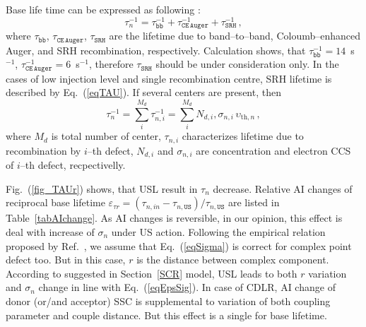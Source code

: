\documentclass[aip,jap, amsmath,amssymb,reprint]{revtex4-1}
\begin{document}
Base life time can be expressed as following \cite{MurphyJAP2011}:
\begin{equation}
\label{eqTAUsum}
\tau_n^{-1}=\tau_\mathtt{bb}^{-1}+\tau_\mathtt{CE\,Auger}^{-1}+\tau_\mathtt{SRH}^{-1}\,,
\end{equation}
where
$\tau_\mathtt{bb}$, $\tau_\mathtt{CE\,Auger}$, $\tau_\mathtt{SRH}$ are the lifetime due to band--to--band, Coloumb--enhanced Auger, and
SRH recombination, respectively.
Calculation shows, that $\tau_\mathtt{bb}^{-1}=14$~s$^{-1}$, $\tau_\mathtt{CE\,Auger}^{-1}=6$~s$^{-1}$,
therefore $\tau_\mathtt{SRH}$ should be under consideration only.
In the cases of low injection level and single recombination centre, SRH lifetime is described by Eq.~(\ref{eqTAU}).
If several centers are present, then
\begin{equation}
\label{eqTAUSHRsum}
\tau_n^{-1}=\sum_i^{M_d}\tau_{n,i}^{-1}=\sum_i^{M_d}N_{d,i},\sigma_{n,i}\,\upsilon_{\mathrm{th},n}\,,
\end{equation}
where
$M_d$ is total number of center,
$\tau_{n,i}$ characterizes lifetime due to recombination by $i$--th defect,
$N_{d,i}$ and $\sigma_{n,i}$ are concentration and electron CCS of $i$--th defect, recpectivelly.

Fig.~(\ref{fig_TAUr}) shows, that USL result in $\tau_n$ decrease.
Relative AI changes of reciprocal base lifetime $\varepsilon_{\tau r}=(\tau_{n,in}-\tau_{n,\mathtt{US}})/\tau_{n,\mathtt{US}}$
are listed in Table~\ref{tabAIchange}.
As AI changes is reversible, in our opinion, this effect is deal with increase of $\sigma_n$ under US action.
Following the empirical relation  proposed by Ref.~, we assume that Eq.~(\ref{eqSigma})
is correct for complex point defect too.
But in this case, $r$ is the distance between complex component.
According to suggested in Section~\ref{SCR} model, USL leads to both $r$ variation
and $\sigma_n$ change in line with Eq.~(\ref{eqEpsSig}).
In case of CDLR, AI change of donor (or/and acceptor) SSC is supplemental to variation of
both coupling parameter and couple distance.
But this effect is a single for base lifetime.
\end{document}

